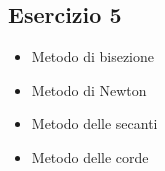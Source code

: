\subsection{Esercizio 5}
\begin{itemize}
    \item Metodo di bisezione
    
    \item Metodo di Newton
    
    \item Metodo delle secanti
    
    \item Metodo delle corde
    
\end{itemize}



